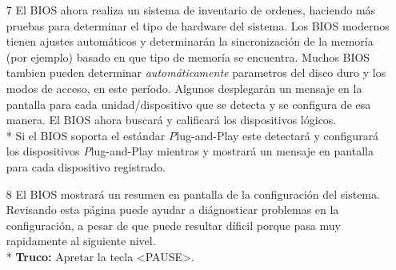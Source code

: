 \begin{enumerate}
		\item[7] El BIOS ahora realiza un sistema de inventario de ordenes,
			haciendo más pruebas para determinar el tipo de hardware del sistema.
			Los BIOS modernos tienen ajustes automáticos y determinarán la
			sincronización de la memoría (por ejemplo) basado en que tipo de
			memoría se encuentra.  Muchos BIOS tambien pueden determinar {\em
			automáticamente} parametros del disco duro y los modos de acceso, en
			este período.  
			Algunos desplegarán un mensaje en la pantalla para cada
			unidad/dispositivo que se detecta y se configura de esa manera. El BIOS
			ahora buscará y calificará los dispositivos lógicos. \\* Si el BIOS
			soporta el estándar {\emph Plug-and-Play}\cite{plugandplay} este
			detectará y configurará los dispositivos {\emph Plug-and-Play} mientras
			y mostrará un mensaje en pantalla para cada dispositivo registrado.
		

		\item[8] El BIOS mostrará un resumen en pantalla de la configuración del
			sistema.  Revisando esta página puede ayudar a diágnosticar problemas
			en la configuración, a pesar de que puede resultar díficil porque
			pasa muy rapidamente al siguiente nivel. \\*
			{\bf Truco:} Apretar la tecla <PAUSE>.

		
		
		

\end{enumerate}
